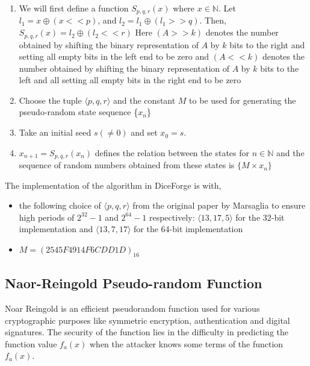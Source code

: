 \documentclass[titlepage, 11pt]{article}
\begin{document}
\begin{enumerate}
    \item 
    We will first define a function $S_{p, q, r}(x)$ where $x \in \mathbb{N}$.
    \newline Let $l_1 = x \oplus (x << p)$, and $l_2 = l_1 \oplus (l_1 >> q)$. Then, $S_{p, q, r}(x) = l_2 \oplus (l_2 << r)$
    \newline
    Here $(A >> k)$ denotes the number obtained by shifting the binary representation of $A$ by $k$ bits to the right and setting all empty bits in the left end to be zero and $(A << k)$ denotes the number obtained by shifting the binary representation of $A$ by $k$ bits to the left and all setting all empty bits in the right end to be zero
    \item Choose the tuple $\langle p, q, r \rangle$ and the constant $M$ to be used for generating the pseudo-random state sequence \{$x_n$\}
    \item Take an initial seed $s (\neq 0)$  and set $x_0 = s$. 
    \item $x_{n+1} = S_{p,q,r}(x_{n})$ defines the relation between the states for $n \in \mathbb{N}$
    \newline
    and the sequence of random numbers obtained from these states is $\{M \times x_n\}$ 
\end{enumerate}
The implementation of the algorithm in DiceForge is with,
\begin{itemize}
    \item the following choice of $\langle p, q, r \rangle$ from the original paper by Marsaglia to ensure high periods of $2^{32} -1$ and $2^{64} -1$ respectively: $\langle 13, 17, 5 \rangle$ for the 32-bit implementation and $\langle 13, 7, 17 \rangle$ for the 64-bit implementation
    \item $M = (2545F4914F6CDD1D)_{16}$
\end{itemize}

\subsection{Naor-Reingold Pseudo-random Function}
Noar Reingold is an efficient pseudorandom function used for various cryptographic purposes like symmetric encryption, authentication and digital signatures. The security of the function lies in the difficulty in predicting the function value $f_{a}(x)$ when the attacker knows some terms of the function $f_{a}(x)$.
\end{document}
